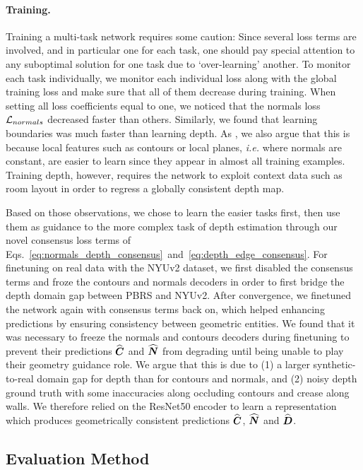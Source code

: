 \documentclass[10pt,twocolumn,letterpaper]{article}
\begin{document}
\paragraph{Training.} 

Training a multi-task network requires some caution: Since several loss terms
are involved, and in particular one for each task, one should pay special
attention to any suboptimal solution for one task due to `over-learning' 
another. To monitor each task individually, we monitor each individual loss 
along with the global training loss and make sure that all of them decrease 
during training. When setting all loss coefficients equal to one, we noticed 
that the normals loss $\mathcal{L}_{normals}$ decreased faster than others. 
Similarly, we found that learning boundaries was much faster than learning 
depth. As \cite{zhang2018deepdepth}, we also argue that this is because local 
features such as contours or local planes, \emph{i.e.} where normals are 
constant, are easier to learn since they appear in almost all training 
examples. Training depth, however, requires the network to exploit context data 
such as room layout in order to regress a globally consistent depth map.

Based on those observations, we chose to learn the easier tasks first, then
use them as guidance to the more complex task of depth estimation through our
novel consensus loss terms of 
Eqs.~\eqref{eq:normals_depth_consensus}~and~\eqref{eq:depth_edge_consensus}. 
For finetuning on real data with the NYUv2 dataset, we first disabled the 
consensus terms and froze the contours and normals decoders in order to first 
bridge the depth domain gap between PBRS and NYUv2. After convergence, we 
finetuned the network again with consensus terms back on, which helped 
enhancing predictions by ensuring consistency between geometric entities. 
We found that it was necessary to freeze the normals and contours decoders 
during finetuning to prevent their predictions $\widehat{\boldsymbol{C}}$ and $\widehat{\boldsymbol{N}}$ from degrading 
until being unable to play their geometry guidance role.
We argue that this is due to (1) a larger synthetic-to-real domain gap for depth than for contours and normals, and (2) noisy depth ground truth with some inaccuracies along occluding contours and crease along walls.
We therefore relied on the ResNet50 encoder to learn a representation which 
produces geometrically consistent predictions $\widehat{\boldsymbol{C}}$, $\widehat{\boldsymbol{N}}$ and $\widehat{\boldsymbol{D}}$.

\subsection{Evaluation Method}\label{ssec:evaluation}
\end{document}
